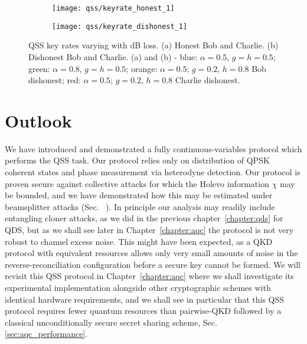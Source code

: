 \begin{figure}[htp]
\centering
	\begin{subfigure}{0.49\linewidth}
	\centering
	\texttt{[image: qss/keyrate\_honest\_1]}
	\caption{}
	\end{subfigure}
	\begin{subfigure}{0.49\linewidth}
	\centering
	\texttt{[image: qss/keyrate\_dishonest\_1]}
	\caption{}
	\end{subfigure}
\caption{\label{fig:qss_keyrate} QSS key rates varying with dB loss. (a) Honest Bob and Charlie. (b) Dishonest Bob and Charlie. (a) and (b) - blue: $\alpha=0.5$, $g=h=0.5$; green: $\alpha = 0.8$, $g = h = 0.5$; orange: $\alpha = 0.5$; $g = 0.2$, $h=0.8$ Bob dishonest; red: $\alpha = 0.5$; $g=0.2$, $h=0.8$ Charlie dishonest.}
\end{figure}















\clearpage
\section{Outlook}
We have introduced and demonstrated a fully continuous-variables protocol which performs the QSS task. Our protocol relies only on distribution of QPSK coherent states and phase measurement via heterodyne detection. Our protocol is proven secure against collective attacks for which the Holevo information $\chi$ may be bounded, and we have demonstrated how this may be estimated under beamsplitter attacks (Sec.~%
). In principle our analysis may readily include entangling cloner attacks, as we did in the previous chapter~\ref{chapter:qds} for QDS, but as we shall see later in Chapter~\ref{chapter:aqc} the protocol is not very robust to channel excess noise. This might have been expected, as a QKD protocol with equivalent resources \cite{Papanastasiou2018} allows only very small amounts of noise in the reverse-reconciliation configuration before a secure key cannot be formed. We will revisit this QSS protocol in Chapter~\ref{chapter:aqc} where we shall investigate its experimental implementation alongside other cryptographic schemes with identical hardware requirements, and we shall see in particular that this QSS protocol requires fewer quantum resources than pairwise-QKD followed by a classical unconditionally secure secret sharing scheme, Sec.
\ref{sec:aqc_performance}.

